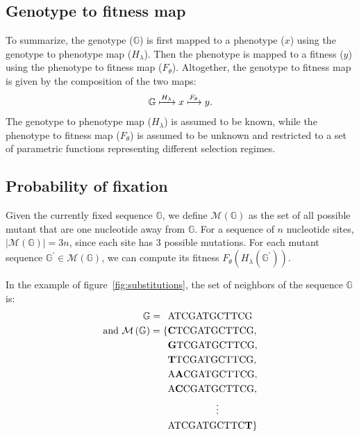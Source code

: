 \documentclass{article}
\newcommand{\NbrSites}{n}
\newcommand{\Geno}{\mathbb{G}}
\newcommand{\GenoDer}{\Geno^{\prime}}
\newcommand{\Neighbors}{\mathcal{M}}
\newcommand{\setNeighbors}{\Neighbors\left(\Geno\right)}
\newcommand{\PhenoDef}{x}
\newcommand{\PhenoParam}{\lambda}
\newcommand{\GenoPhenoMap}{H_{\PhenoParam}}
\newcommand{\PhenoDer}{\GenoPhenoMap\left(\GenoDer\right)}
\newcommand{\FitParam}{\theta}
\newcommand{\PhenoFitMapDef}{F}
\newcommand{\PhenoFitMap}{\PhenoFitMapDef_{\FitParam}}
\newcommand{\FitDef}{y}
\newcommand{\FitDer}{\PhenoFitMap\left(\PhenoDer\right)}
\begin{document}
    \newpage

    \subsection{Genotype to fitness map}\label{subsec:genotype-to-fitness-map}

    To summarize, the genotype ($\Geno$) is first mapped to a phenotype ($\PhenoDef$) using the genotype to phenotype map ($\GenoPhenoMap$).
    Then the phenotype is mapped to a fitness ($\FitDef$) using the phenotype to fitness map ($\PhenoFitMap$).
    Altogether, the genotype to fitness map is given by the composition of the two maps:
    \begin{align}
        \Geno \xmapsto{\GenoPhenoMap} \PhenoDef \xmapsto{\PhenoFitMap} \FitDef.
    \end{align}
    The genotype to phenotype map ($\GenoPhenoMap$) is assumed to be known, while the phenotype to fitness map ($\PhenoFitMap$) is assumed to be unknown and restricted to a set of parametric functions representing different selection regimes.

    \subsection{Probability of fixation}\label{subsec:probability-of-fixation}

    Given the currently fixed sequence $\Geno$, we define $\setNeighbors$ as the set of all possible mutant that are one nucleotide away from $\Geno$.
    For a sequence of $\NbrSites$ nucleotide sites, $\left| \setNeighbors \right| = 3 \NbrSites$, since each site has $3$ possible mutations.
    For each mutant sequence $\GenoDer \in \setNeighbors$, we can compute its fitness $\FitDer$.

    In the example of figure~\ref{fig:substitutions}, the set of neighbors of the sequence $\Geno$ is:
    \begin{align*}
        \Geno = \hspace{0.75em} & \text{ATCGATGCTTCG} \\
        \text{and } \setNeighbors = \{ & \text{\textbf{C}TCGATGCTTCG}, \\
        & \text{\textbf{G}TCGATGCTTCG}, \\
        & \text{\textbf{T}TCGATGCTTCG}, \\
        & \text{A\textbf{A}CGATGCTTCG}, \\
        & \text{A\textbf{C}CGATGCTTCG}, \\
        & \quad \quad \quad \quad \quad \vdots  \\
        & \text{ATCGATGCTTC\textbf{T}} \}
    \end{align*}
\end{document}

